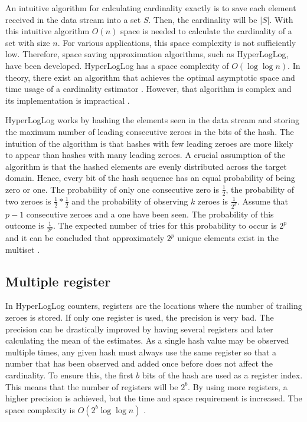 An intuitive algorithm for calculating cardinality exactly is to save each element received in the data stream into a set $S$. Then, the cardinality will be $|S|$. With this intuitive algorithm $O(n)$ space is needed to calculate the cardinality of a set with size $n$. For various applications, this space complexity is not sufficiently low. Therefore, space saving approximation algorithms, such as HyperLogLog, have been developed. HyperLogLog has a space complexity of $O(\log\log n)$. In theory, there exist an algorithm that achieves the optimal asymptotic space and time usage of a cardinality estimator \cite{optimal_cardinality}. However, that algorithm is complex and its implementation is impractical \cite{google_hyperloglog}. 

HyperLogLog works by hashing the elements seen in the data stream and storing the maximum number of leading consecutive zeroes in the bits of the hash. The intuition of the algorithm is that hashes with few leading zeroes are more likely to appear than hashes with many leading zeroes. A crucial assumption of the algorithm is that the hashed elements are evenly distributed across the target domain. Hence, every bit of the hash sequence has an equal probability of being zero or one. The probability of only one consecutive zero is $\frac{1}{2}$, the probability of two zeroes is $\frac{1}{2}*\frac{1}{2}$ and the probability of observing $k$ zeroes is $\frac {1} {2^k}$. Assume that $p-1$ consecutive zeroes and a one have been seen. The probability of this outcome is $\frac{1}{2^p}$. The expected number of tries for this probability to occur is $2^p$ and it can be concluded that approximately $2^p$ unique elements exist in the multiset \cite{hyperloglog}. 


\subsection{Multiple register}
In HyperLogLog counters, registers are the locations where the number of trailing zeroes is stored. If only one register is used, the precision is very bad. The precision can be drastically improved by having several registers and later calculating the mean of the estimates. As a single hash value may be observed multiple times, any given hash must always use the same register so that a number that has been observed and added once before does not affect the cardinality. To ensure this, the first $b$ bits of the hash are used as a register index. This means that the number of registers will be $2^b$. By using more registers, a higher precision is achieved, but the time and space requirement is increased. The space complexity is $O(2^b\log\log n)$ \cite{hyperloglog}.

